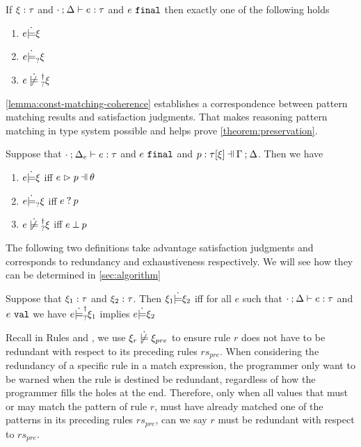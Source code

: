 \begin{theorem}
  \label{theorem:exclusive-constraint-satisfaction}
  If $\xi : \tau$ and $\cdot \mathbin{;} \Delta \vdash e : \tau$ and $e ~\mathtt{final}$ then exactly one of the following holds
  \begin{enumerate}
  \item $e \dot{\models} \xi$
  \item $e \dot{\models}_{?} \xi$
  \item $\cnotsatisfyormay{e}{\xi}$
  \end{enumerate}
\end{theorem}

\autoref{lemma:const-matching-coherence} establishes a correspondence
between pattern matching results and satisfaction judgments. That makes
reasoning pattern matching in type system possible and helps prove
\autoref{theorem:preservation}.

\begin{lemma}
  \label{lemma:const-matching-coherence}
  Suppose that $\cdot \mathbin{;} \Delta_e \vdash e : \tau$ and $e ~\mathtt{final}$ and $\chpattyp{p}{\tau}{\xi}{\Gamma}{\Delta}$. Then we have
  \begin{enumerate}
  \item $e \dot{\models} \xi$ iff $\hpatmatch{e}{p}{\theta}$
  \item $e \dot{\models}_{?} \xi$ iff $e \mathbin{?} p$
  \item $\cnotsatisfyormay{e}{\xi}$ iff $e \mathbin{\bot} p$
  \end{enumerate}
\end{lemma}

The following two definitions take advantage satisfaction judgments and
corresponds to redundancy and exhaustiveness respectively. We will see how they
can be determined in \autoref{sec:algorithm}

\begin{definition}
  \label{definition:const-entailment}
  Suppose that $\xi_1 : \tau$ and $\xi_2 : \tau$.
  Then $\xi_1 \dot{\models} \xi_2$ iff for all $e$ such that $\cdot \mathbin{;} \Delta \vdash e : \tau$ and $e ~\mathtt{val}$ we have $e \dot{\models}_{?}^{\dag} \xi_1$ implies $e \dot{\models} \xi_2$
\end{definition}

Recall in Rules \TOneRules and \TRules, we use $\cnotsatisfy{\xi_r}{\xi_{pre}}$ to ensure rule $r$ does not have to be redundant with respect to its preceding rules $rs_{pre}$. When considering the redundancy of a specific rule in a match expression, the programmer only want to be warned when the rule is destined be redundant, regardless of how the programmer fills the holes at the end. Therefore, only when all values that must or may match the pattern of rule $r$, must have already matched one of the patterns in its preceding rules $rs_{pre}$, can we say $r$ must be redundant with respect to $rs_{pre}$.

